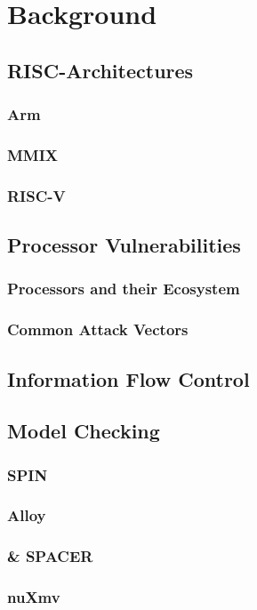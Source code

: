 \section{Background}

\subsection{RISC-Architectures}

\subsubsection{Arm}

\subsubsection{MMIX}

\subsubsection{RISC-V}

\subsection{Processor Vulnerabilities}

\subsubsection{Processors and their Ecosystem}

\subsubsection{Common Attack Vectors}

\subsection{Information Flow Control}

\subsection{Model Checking}

\subsubsection{SPIN}

\subsubsection{Alloy}

\subsubsection{\muZ{} \& SPACER}

\subsubsection{nuXmv}
